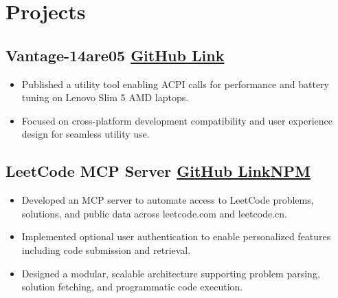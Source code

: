 \documentclass[10pt]{article}
\newcommand{\rside}[1]{
  \hfill {\normalfont\color{accent} #1}%
}
\begin{document}
\section{Projects}
\subsection{Vantage-14are05 \rside{\href{https://github.com/ayushjaipuriyar/vantage-14are05}{GitHub Link}}}
\begin{itemize}
  \item Published a utility tool enabling ACPI calls for performance and battery tuning on Lenovo Slim 5 AMD laptops.
  \item Focused on cross-platform development compatibility and user experience design for seamless utility use.
\end{itemize}

\subsection{LeetCode MCP Server \rside{\href{https://github.com/ayushjaipuriyar/leetcode-mcpserver}{GitHub Link}\href{https://www.npmjs.com/package/leetcode-mcpserver}{NPM}}}
\begin{itemize}
  \item Developed an MCP server to automate access to LeetCode problems, solutions, and public data across leetcode.com and leetcode.cn.
  \item Implemented optional user authentication to enable personalized features including code submission and retrieval.
  \item Designed a modular, scalable architecture supporting problem parsing, solution fetching, and programmatic code execution.
\end{itemize}
\end{document}

